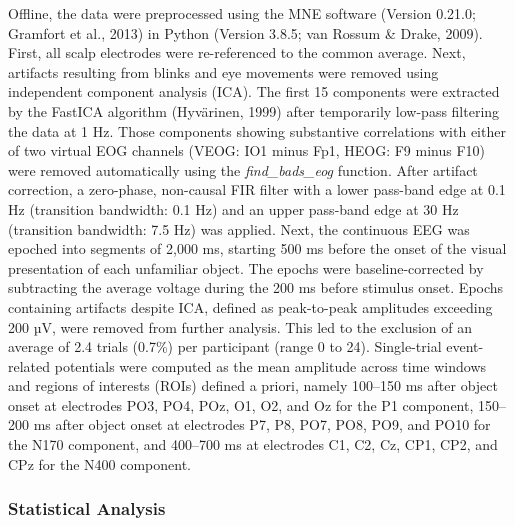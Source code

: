 \documentclass[
  english,
  man,11pt,floatsintext]{apa7}
\begin{document}
Offline, the data were preprocessed using the MNE software (Version 0.21.0; Gramfort et al., 2013) in Python (Version 3.8.5; van Rossum \& Drake, 2009). First, all scalp electrodes were re-referenced to the common average. Next, artifacts resulting from blinks and eye movements were removed using independent component analysis (ICA). The first 15 components were extracted by the FastICA algorithm (Hyvärinen, 1999) after temporarily low-pass filtering the data at 1 Hz. Those components showing substantive correlations with either of two virtual EOG channels (VEOG: IO1 minus Fp1, HEOG: F9 minus F10) were removed automatically using the \emph{find\_bads\_eog} function. After artifact correction, a zero-phase, non-causal FIR filter with a lower pass-band edge at 0.1 Hz (transition bandwidth: 0.1 Hz) and an upper pass-band edge at 30 Hz (transition bandwidth: 7.5 Hz) was applied. Next, the continuous EEG was epoched into segments of 2,000 ms, starting 500 ms before the onset of the visual presentation of each unfamiliar object. The epochs were baseline-corrected by subtracting the average voltage during the 200 ms before stimulus onset. Epochs containing artifacts despite ICA, defined as peak-to-peak amplitudes exceeding 200 µV, were removed from further analysis. This led to the exclusion of an average of 2.4 trials (0.7\%) per participant (range 0 to 24). Single-trial event-related potentials were computed as the mean amplitude across time windows and regions of interests (ROIs) defined a priori, namely 100--150 ms after object onset at electrodes PO3, PO4, POz, O1, O2, and Oz for the P1 component, 150--200 ms after object onset at electrodes P7, P8, PO7, PO8, PO9, and PO10 for the N170 component, and 400--700 ms at electrodes C1, C2, Cz, CP1, CP2, and CPz for the N400 component.

\hypertarget{statistical-analysis}{%
\subsubsection{Statistical Analysis}\label{statistical-analysis}}
\end{document}
